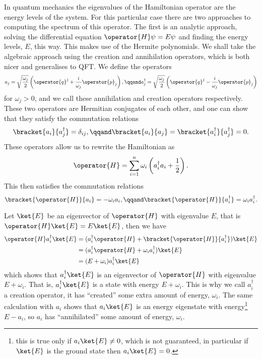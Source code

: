 \documentclass[fleqn]{NotesClass}
\newcommand{\hermit}{{\dagger}}
\begin{document}
    In quantum mechanics the eigenvalues of the Hamiltonian operator are the energy levels of the system.
    For this particular case there are two approaches to computing the spectrum of this operator.
    The first is an analytic approach, solving the differential equation \(\operator{H}\psi = E\psi\) and finding the energy levels, \(E\), this way.
    This makes use of the Hermite polynomials.
    We shall take the algebraic approach using the creation and annihilation operators, which is both nicer and generalises to QFT.
    We define the operators
    \begin{equation}
        a_j = \sqrt{\frac{\omega_j}{2}} \left( \operator{q}^j + \frac{i}{\omega_j}\operator{p}_j \right), \qqand a_j^{\hermit} = \sqrt{\frac{\omega_j}{2}} \left( \operator{q}^j - \frac{i}{\omega_j}\operator{p}_j \right)
    \end{equation}
    for \(\omega_j > 0\), and we call these annihilation and creation operators respectively.
    These two operators are Hermitian conjugates of each other, and one can show that they satisfy the commutation relations
    \begin{equation}
        \bracket{a_i}{a_j^\hermit} = \delta_{ij}, \qqand \bracket{a_i}{a_j} = \bracket{a_i^{\hermit}}{a_j^{\hermit}} = 0.
    \end{equation}
    These operators allow us to rewrite the Hamiltonian as
    \begin{equation}
        \operator{H} = \sum_{i=1}^n \omega_i\left( a_i^{\hermit}a_i + \frac{1}{2} \right).
    \end{equation}
    This then satisfies the commutation relations
    \begin{equation}
        \bracket{\operator{H}}{a_i} = -\omega_ia_i, \qqand \bracket{\operator{H}}{a_i^{\hermit}} = \omega_ia_i^\hermit.
    \end{equation}
    
    Let \(\ket{E}\) be an eigenvector of \(\operator{H}\) with eigenvalue \(E\), that is \(\operator{H}\ket{E} = E\ket{E}\), then we have
    \begin{align}
        \operator{H}a_i^{\hermit}\ket{E} &= (a_i^{\hermit}\operator{H} + \bracket{\operator{H}}{a_i^{\hermit}})\ket{E}\\
        &= (a_i^{\hermit}\operator{H} + \omega_ia_i^\hermit)\ket{E}\\
        &= (E + \omega_i)a_i^\hermit\ket{E}
    \end{align}
    which shows that \(a_i^\hermit\ket{E}\) is an eigenvector of \(\operator{H}\) with eigenvalue \(E + \omega_i\).
    That is, \(a_i^\hermit\ket{E}\) is a state with energy \(E + \omega_i\).
    This is why we call \(a_i^{\hermit}\) a creation operator, it has \enquote{created} some extra amount of energy, \(\omega_i\).
    The same calculation with \(a_i\) shows that \(a_i\ket{E}\) is an energy eigenstate with energy\footnote{this is true only if \(a_i\ket{E} \ne 0\), which is not guaranteed, in particular if \(\ket{E}\) is the ground state then \(a_i\ket{E} = 0\).} \(E - a_i\), so \(a_i\) has \enquote{annihilated} some amount of energy, \(\omega_i\).
    
\end{document}
